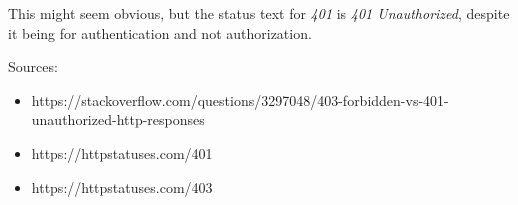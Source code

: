 \documentclass[bsc,frontabs,twoside,singlespacing,parskip,deptreport]{infthesis}     %
\begin{document}
This might seem obvious, but the status text for \emph{401} is \emph{401 Unauthorized},
despite it being for authentication and not authorization.

Sources:
\begin{itemize}
  \item https://stackoverflow.com/questions/3297048/403-forbidden-vs-401-unauthorized-http-responses
  \item https://httpstatuses.com/401
  \item https://httpstatuses.com/403
\end{itemize}




\end{document}
